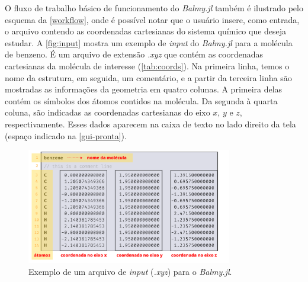 O fluxo de trabalho básico de funcionamento do \textit{Balmy.jl} também é ilustrado pelo esquema da \autoref{workflow}, onde é possível notar que o usuário insere, como entrada, o arquivo contendo as coordenadas cartesianas do sistema químico que deseja estudar. A \autoref{fig:input} mostra um exemplo de \textit{input} do \textit{Balmy.jl} para a molécula de benzeno. É um arquivo de extensão \textit{.xyz} que contém as coordenadas cartesianas da molécula de interesse (\autoref{tab:coords}). Na primeira linha, temos o nome da estrutura, em seguida, um comentário, e a partir da terceira linha são mostradas as informações da geometria em quatro colunas. A primeira delas contém os símbolos dos átomos contidos na molécula. Da segunda à quarta coluna, são indicadas as coordenadas cartesianas do eixo $x$, $y$ e $z$, respectivamente. Esses dados aparecem na caixa de texto no lado direito da tela (espaço indicado na \autoref{gui-pronta}).

\begin{figure}[htb]
	\caption{\label{fig:input} Exemplo de um arquivo de \textit{input} (\textit{.xyz}) para o \textit{Balmy.jl}.}
	\begin{center}
		\includegraphics[width=0.8\textwidth]{images/fig2(4).png}
	\end{center}
\end{figure}

